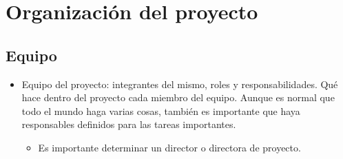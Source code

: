 
\chapter{Organizaci\'on del proyecto} %

\label{Chapter2} %


\section{Equipo}

\begin{itemize}
	\item Equipo del proyecto: integrantes del mismo, roles y responsabilidades. Qué hace dentro del proyecto cada miembro del equipo. Aunque es normal que todo el mundo haga varias cosas, también es importante que haya responsables definidos para las tareas importantes.
	
	\begin{itemize}
	\item Es importante determinar un director o directora de proyecto.
	\end{itemize}
\end{itemize}